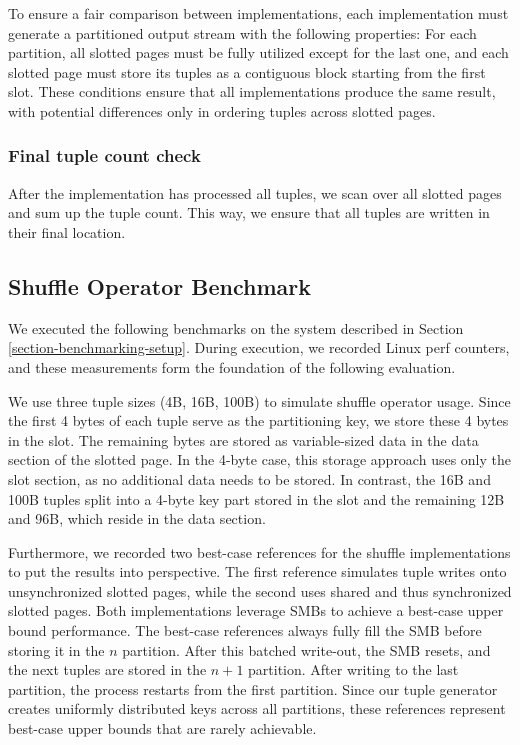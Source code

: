 To ensure a fair comparison between implementations, each implementation must generate a partitioned output stream with the following properties: For each partition, all slotted pages must be fully utilized except for the last one, and each slotted page must store its tuples as a contiguous block starting from the first slot.
These conditions ensure that all implementations produce the same result, with potential differences only in ordering tuples across slotted pages.
\subsubsection{Final tuple count check}
After the implementation has processed all tuples, we scan over all slotted pages and sum up the tuple count.
This way, we ensure that all tuples are written in their final location.

\subsection{Shuffle Operator Benchmark}
We executed the following benchmarks on the system described in Section \ref{section-benchmarking-setup}.
During execution, we recorded Linux perf counters, and these measurements form the foundation of the following evaluation.

We use three tuple sizes (4B, 16B, 100B) to simulate shuffle operator usage.
Since the first 4 bytes of each tuple serve as the partitioning key, we store these 4 bytes in the slot.
The remaining bytes are stored as variable-sized data in the data section of the slotted page.
In the 4-byte case, this storage approach uses only the slot section, as no additional data needs to be stored.
In contrast, the 16B and 100B tuples split into a 4-byte key part stored in the slot and the remaining 12B and 96B, which reside in the data section.

Furthermore, we recorded two best-case references for the shuffle implementations to put the results into perspective.
The first reference simulates tuple writes onto unsynchronized slotted pages, while the second uses shared and thus synchronized slotted pages.
Both implementations leverage \acfp{SMB} to achieve a best-case upper bound performance.
The best-case references always fully fill the \ac{SMB} before storing it in the $n$ partition.
After this batched write-out, the \ac{SMB} resets, and the next tuples are stored in the $n+1$ partition.
After writing to the last partition, the process restarts from the first partition.
Since our tuple generator creates uniformly distributed keys across all partitions, these references represent best-case upper bounds that are rarely achievable.


